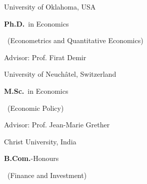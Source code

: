 	{%
		University of Oklahoma, USA}
	{%
		\textbf{Ph.D.}~in Economics \begin{footnotesize}
				~(Econometrics and Quantitative Economics)
			\end{footnotesize}}
	{%
	Advisor: Prof. Firat Demir}

		{%
			University of Neuch\^atel, Switzerland}
		{%
			\textbf{M.Sc.}~in Economics\begin{footnotesize}
				~(Economic Policy)
			\end{footnotesize}}
		{%
	Advisor: Prof. Jean-Marie Grether}

		{%
			Christ University, India}
		{%
			\textbf{B.Com.}-Honours\begin{footnotesize}
				~(Finance and Investment)
			\end{footnotesize}}
			{}
